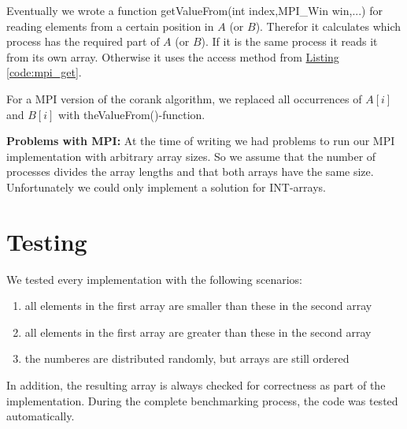 Eventually we wrote a function getValueFrom(int index,MPI\_Win win,...) for reading elements from a certain position in $A$ (or $B$).
Therefor it calculates which process has the required part of $A$ (or $B$).
If it is the same process it reads it from its own array.
Otherwise it uses the access method from \hyperref[code:mpi_get]{Listing \ref*{code:mpi_get}}.

For a MPI version of the corank algorithm, we replaced all occurrences of $A[i]$ and $B[i]$ with theValueFrom()-function.


\textbf{Problems with MPI:}
At the time of writing we had problems to run our MPI implementation with arbitrary array sizes.
So we assume that the number of processes divides the array lengths and that both arrays have the same size.
Unfortunately we could only implement a solution for INT-arrays.

\section{Testing}
We tested every implementation with the following scenarios:
\begin{enumerate}
  \item all elements in the first array are smaller than these in the second array
  \item all elements in the first array are greater than these in the second array
  \item the numberes are distributed randomly, but arrays are still ordered
\end{enumerate}
In addition, the resulting array is always checked for correctness as part of the implementation.
During the complete benchmarking process, the code was tested automatically.



